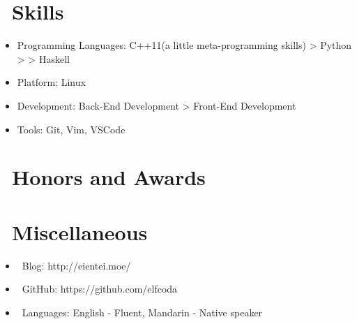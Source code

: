 \documentclass{resume}
\begin{document}
\section{\faCogs\ Skills}
\begin{itemize}[parsep=0.5ex]
  \item Programming Languages: C++11(a little meta-programming skills) > Python > > Haskell
  \item Platform: Linux
  \item Development: Back-End Development > Front-End Development
  \item Tools: Git, Vim, VSCode
\end{itemize}

\section{\faHeartO\ Honors and Awards}
\datedline{\textit{} }{}

\section{\faInfo\ Miscellaneous}
\begin{itemize}[parsep=0.5ex]
  \item \faHome\ Blog: http://eientei.moe/
  \item \faGithubAlt\ GitHub: https://github.com/elfcoda
  \item \faLanguage\ Languages: English - Fluent, Mandarin - Native speaker
\end{itemize}

%
%
\end{document}
